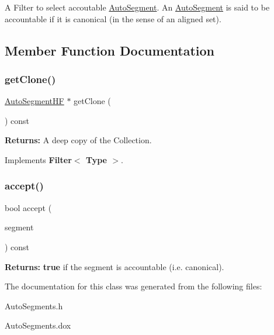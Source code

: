 A Filter to select accoutable \mbox{\hyperlink{classKatabatic_1_1AutoSegment}{Auto\+Segment}}. An \mbox{\hyperlink{classKatabatic_1_1AutoSegment}{Auto\+Segment}} is said to be accountable if it is canonical (in the sense of an aligned set). 

\subsection{Member Function Documentation}
\mbox{\label{classKatabatic_1_1AutoSegments__IsAccountable_a0a6021852a0c5681a7b53dce6b2b87a4}} 
\subsubsection{\texorpdfstring{get\+Clone()}{getClone()}}
{\footnotesize\ttfamily \mbox{\hyperlink{namespaceKatabatic_a790418bb65a9a13859868df3e8f53598}{Auto\+Segment\+HF}} $\ast$ get\+Clone (\begin{DoxyParamCaption}{ }\end{DoxyParamCaption}) const\hspace{0.3cm}{\ttfamily [virtual]}}

{\bfseries Returns\+:} A deep copy of the Collection. 

Implements \textbf{ Filter$<$ Type $>$}.

\mbox{\label{classKatabatic_1_1AutoSegments__IsAccountable_a360f3816925114260aeb7ccdab0ea69e}} 
\subsubsection{\texorpdfstring{accept()}{accept()}}
{\footnotesize\ttfamily bool accept (\begin{DoxyParamCaption}\item[{\mbox{\hyperlink{classKatabatic_1_1AutoSegment}{Auto\+Segment}} $\ast$}]{segment }\end{DoxyParamCaption}) const\hspace{0.3cm}{\ttfamily [virtual]}}

{\bfseries Returns\+:} {\bfseries true} if the {\ttfamily segment} is accountable (i.\+e. canonical). 

The documentation for this class was generated from the following files\+:\begin{DoxyCompactItemize}
\item 
Auto\+Segments.\+h\item 
Auto\+Segments.\+dox\end{DoxyCompactItemize}
